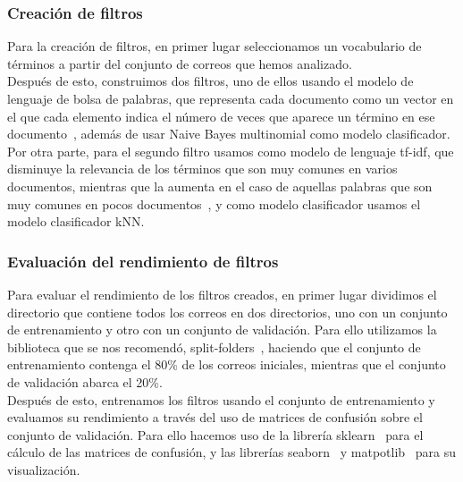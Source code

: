 \documentclass[conference,a4paper]{IEEEtran}
\begin{document}
\subsubsection{Creación de filtros}
Para la creación de filtros, en primer lugar seleccionamos un vocabulario de términos a partir del conjunto de correos que hemos analizado. \\

Después de esto, construimos dos filtros, uno de ellos usando el modelo de lenguaje de bolsa de palabras, que representa cada documento como un vector en el que cada elemento indica el número de veces que aparece un término en ese documento~\cite{b1}, además de usar Naive Bayes multinomial como modelo clasificador. \\

Por otra parte, para el segundo filtro usamos como modelo de lenguaje tf-idf, que disminuye la relevancia de los términos que son muy comunes en varios documentos, mientras que la aumenta en el caso de aquellas palabras que son muy comunes en pocos documentos~\cite{b1}, y como modelo clasificador usamos el modelo clasificador kNN. \\

\subsubsection{Evaluación del rendimiento de filtros}
Para evaluar el rendimiento de los filtros creados, en primer lugar dividimos el directorio que contiene todos los correos en dos directorios, uno con un conjunto de entrenamiento y otro con un conjunto de validación. Para ello utilizamos la biblioteca que se nos recomendó, split-folders~\cite{b5}, haciendo que el conjunto de entrenamiento contenga el 80\% de los correos iniciales, mientras que el conjunto de validación abarca el 20\%. \\

Después de esto, entrenamos los filtros usando el conjunto de entrenamiento y evaluamos su rendimiento a través del uso de matrices de confusión sobre el conjunto de validación. Para ello hacemos uso de la librería sklearn~\cite{b7} para el cálculo de las matrices de confusión, y las librerías seaborn~\cite{b8} y matpotlib~\cite{b9} para su visualización. \\
\end{document}
